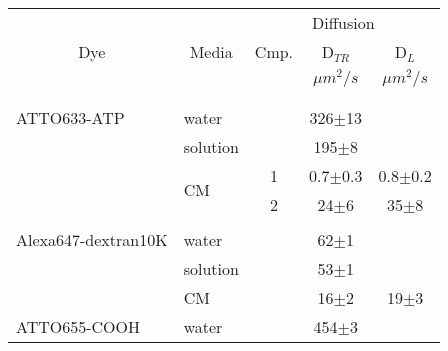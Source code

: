   \begin{tabular}{llccc}
\hline
&   & \multicolumn{3}{c}{Diffusion}  \\
\multicolumn{1}{c}{Dye} & \multicolumn{1}{c}{Media} &
 Cmp.  & \multicolumn{1}{c}{D$_{TR}$} &
\multicolumn{1}{c}{D$_L$} \\
 & & &
 \multicolumn{1}{c}{$\mu m^2/s$} & \multicolumn{1}{c}{$\mu m^2/s$} \\
\hline
\\ 
\\ ATTO633-ATP & water &  & {326$\pm$13} & \\
 & solution &  & {195$\pm$8}&   \\
 &\multirow{2}{*}{\ac{CM}}   &1 & {0.7$\pm$0.3} &
 {0.8$\pm$0.2}\\
 &   &2 & {24$\pm$6} & {35$\pm$8}\\
\\ Alexa647-dextran10K & water &  & {62$\pm$1}& \\
 & solution &   & {53$\pm$1}&   \\
 & \ac{CM}\ &   & {16$\pm$2} & {19$\pm$3}
 \\
ATTO655-COOH & water &  & {454$\pm$3} &  \\

\end{tabular}

